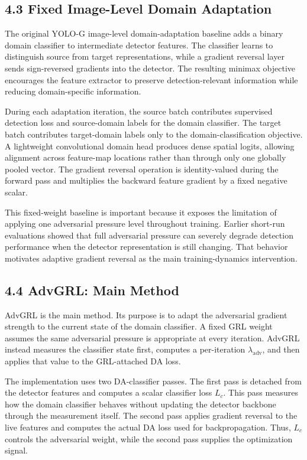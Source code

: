 \documentclass[
  11pt,
]{article}
\begin{document}
\hypertarget{fixed-image-level-domain-adaptation}{%
\subsection{4.3 Fixed Image-Level Domain
Adaptation}\label{fixed-image-level-domain-adaptation}}

The original YOLO-G image-level domain-adaptation baseline adds a binary
domain classifier to intermediate detector features. The classifier
learns to distinguish source from target representations, while a
gradient reversal layer sends sign-reversed gradients into the detector.
The resulting minimax objective encourages the feature extractor to
preserve detection-relevant information while reducing domain-specific
information.

During each adaptation iteration, the source batch contributes
supervised detection loss and source-domain labels for the domain
classifier. The target batch contributes target-domain labels only to
the domain-classification objective. A lightweight convolutional domain
head produces dense spatial logits, allowing alignment across
feature-map locations rather than through only one globally pooled
vector. The gradient reversal operation is identity-valued during the
forward pass and multiplies the backward feature gradient by a fixed
negative scalar.

This fixed-weight baseline is important because it exposes the
limitation of applying one adversarial pressure level throughout
training. Earlier short-run evaluations showed that full adversarial
pressure can severely degrade detection performance when the detector
representation is still changing. That behavior motivates adaptive
gradient reversal as the main training-dynamics intervention.

\hypertarget{advgrl-main-method}{%
\subsection{4.4 AdvGRL: Main Method}\label{advgrl-main-method}}

AdvGRL is the main method. Its purpose is to adapt the adversarial
gradient strength to the current state of the domain classifier. A fixed
GRL weight assumes the same adversarial pressure is appropriate at every
iteration. AdvGRL instead measures the classifier state first, computes
a per-iteration \(\lambda_{\mathrm{adv}}\), and then applies that value
to the GRL-attached DA loss.

The implementation uses two DA-classifier passes. The first pass is
detached from the detector features and computes a scalar classifier
loss \(L_c\). This pass measures how the domain classifier behaves
without updating the detector backbone through the measurement itself.
The second pass applies gradient reversal to the live features and
computes the actual DA loss used for backpropagation. Thus, \(L_c\)
controls the adversarial weight, while the second pass supplies the
optimization signal.
\end{document}
